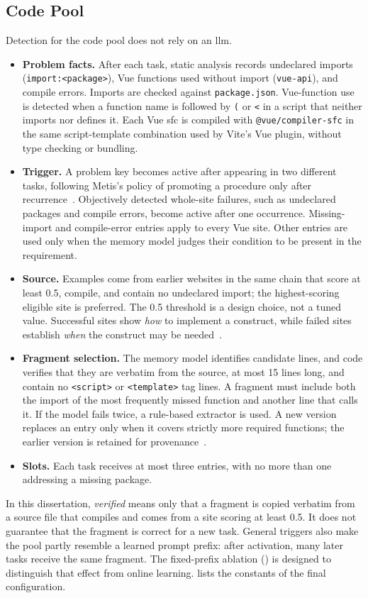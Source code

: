 \subsection{Code Pool}
\label{sec:codepool}
Detection for the code pool does not rely on an \gls{llm}.
\begin{itemize}
  \item \textbf{Problem facts.} After each task, static analysis records undeclared imports (\texttt{import:<package>}), Vue functions used without import (\texttt{vue-api}), and compile errors. Imports are checked against \texttt{package.json}. Vue-function use is detected when a function name is followed by \texttt{(} or \texttt{<} in a script that neither imports nor defines it. Each Vue \gls{sfc} is compiled with \texttt{@vue/compiler-sfc} in the same script-template combination used by Vite's Vue plugin, without type checking or bundling.
  \item \textbf{Trigger.} A problem key becomes active after appearing in two different tasks, following Metis's policy of promoting a procedure only after recurrence~\cite{dai2026metis}. Objectively detected whole-site failures, such as undeclared packages and compile errors, become active after one occurrence. Missing-import and compile-error entries apply to every Vue site. Other entries are used only when the memory model judges their condition to be present in the requirement.
  \item \textbf{Source.} Examples come from earlier websites in the same chain that score at least 0.5, compile, and contain no undeclared import; the highest-scoring eligible site is preferred. The 0.5 threshold is a design choice, not a tuned value. Successful sites show \emph{how} to implement a construct, while failed sites establish \emph{when} the construct may be needed~\cite{reasoningbank2025}.
  \item \textbf{Fragment selection.} The memory model identifies candidate lines, and code verifies that they are verbatim from the source, at most 15 lines long, and contain no \texttt{<script>} or \texttt{<template>} tag lines. A fragment must include both the import of the most frequently missed function and another line that calls it. If the model fails twice, a rule-based extractor is used. A new version replaces an entry only when it covers strictly more required functions; the earlier version is retained for provenance~\cite{ace2026}.
  \item \textbf{Slots.} Each task receives at most three entries, with no more than one addressing a missing package.
\end{itemize}
In this dissertation, \textit{verified} means only that a fragment is copied verbatim from a source file that compiles and comes from a site scoring at least 0.5. It does not guarantee that the fragment is correct for a new task. General triggers also make the pool partly resemble a learned prompt prefix: after activation, many later tasks receive the same fragment. The fixed-prefix ablation () is designed to distinguish that effect from online learning.  lists the constants of the final configuration.

